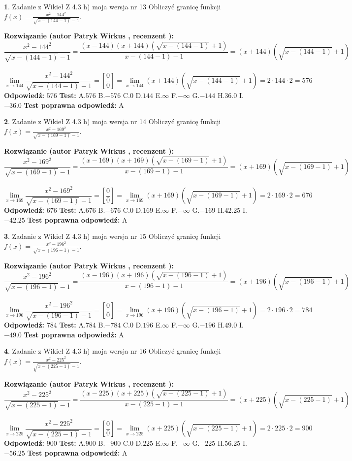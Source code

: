 \documentclass[12pt, a4paper]{article}
\theoremstyle{definition} %
\newtheorem{zad}{}
\newcommand{\zadStart}[1]{\begin{zad}#1\newline}
\newcommand{\zadStop}{\end{zad}}
\newcommand{\rozwStart}[2]{\noindent \textbf{Rozwiązanie (autor #1 , recenzent #2): }\newline}
\newcommand{\rozwStop}{\newline}
\newcommand{\odpStart}{\noindent \textbf{Odpowiedź:}\newline}
\newcommand{\odpStop}{\newline}
\newcommand{\testStart}{\noindent \textbf{Test:}\newline}
\newcommand{\testStop}{\newline}
\newcommand{\kluczStart}{\noindent \textbf{Test poprawna odpowiedź:}\newline}
\newcommand{\kluczStop}{\newline}
\begin{document}
\zadStart{Zadanie z Wikieł Z 4.3 h) moja wersja nr 13}
Obliczyć granicę funkcji $f(x)=\frac{x^{2} - 144^{2}}{\sqrt{x-(144-1)}-1}$.
\zadStop
\rozwStart{Patryk Wirkus}{}
$$\frac{x^{2} - 144^{2}}{\sqrt{x-(144-1)}-1}=\frac{(x-144)(x+144)(\sqrt{x-(144-1)}+1)}{x-(144-1)-1}=(x+144)(\sqrt{x-(144-1)}+1)$$
\\
$$\lim\limits_{x\to 144}\frac{x^{2} - 144^{2}}{\sqrt{x-(144-1)}-1}=[\frac{0}{0}]=
\lim\limits_{x\to 144}(x+144)(\sqrt{x-(144-1)}+1) = 2\cdot144 \cdot 2 = 576$$
\rozwStop
\odpStart
$576$
\odpStop
\testStart
A.$576$
B.$-576$
C.$0$
D.$144$
E.$\infty$
F.$-\infty$
G.$-144$
H.$36.0$
I.$-36.0$
\testStop
\kluczStart
A
\kluczStop



\zadStart{Zadanie z Wikieł Z 4.3 h) moja wersja nr 14}
Obliczyć granicę funkcji $f(x)=\frac{x^{2} - 169^{2}}{\sqrt{x-(169-1)}-1}$.
\zadStop
\rozwStart{Patryk Wirkus}{}
$$\frac{x^{2} - 169^{2}}{\sqrt{x-(169-1)}-1}=\frac{(x-169)(x+169)(\sqrt{x-(169-1)}+1)}{x-(169-1)-1}=(x+169)(\sqrt{x-(169-1)}+1)$$
\\
$$\lim\limits_{x\to 169}\frac{x^{2} - 169^{2}}{\sqrt{x-(169-1)}-1}=[\frac{0}{0}]=
\lim\limits_{x\to 169}(x+169)(\sqrt{x-(169-1)}+1) = 2\cdot169 \cdot 2 = 676$$
\rozwStop
\odpStart
$676$
\odpStop
\testStart
A.$676$
B.$-676$
C.$0$
D.$169$
E.$\infty$
F.$-\infty$
G.$-169$
H.$42.25$
I.$-42.25$
\testStop
\kluczStart
A
\kluczStop



\zadStart{Zadanie z Wikieł Z 4.3 h) moja wersja nr 15}
Obliczyć granicę funkcji $f(x)=\frac{x^{2} - 196^{2}}{\sqrt{x-(196-1)}-1}$.
\zadStop
\rozwStart{Patryk Wirkus}{}
$$\frac{x^{2} - 196^{2}}{\sqrt{x-(196-1)}-1}=\frac{(x-196)(x+196)(\sqrt{x-(196-1)}+1)}{x-(196-1)-1}=(x+196)(\sqrt{x-(196-1)}+1)$$
\\
$$\lim\limits_{x\to 196}\frac{x^{2} - 196^{2}}{\sqrt{x-(196-1)}-1}=[\frac{0}{0}]=
\lim\limits_{x\to 196}(x+196)(\sqrt{x-(196-1)}+1) = 2\cdot196 \cdot 2 = 784$$
\rozwStop
\odpStart
$784$
\odpStop
\testStart
A.$784$
B.$-784$
C.$0$
D.$196$
E.$\infty$
F.$-\infty$
G.$-196$
H.$49.0$
I.$-49.0$
\testStop
\kluczStart
A
\kluczStop



\zadStart{Zadanie z Wikieł Z 4.3 h) moja wersja nr 16}
Obliczyć granicę funkcji $f(x)=\frac{x^{2} - 225^{2}}{\sqrt{x-(225-1)}-1}$.
\zadStop
\rozwStart{Patryk Wirkus}{}
$$\frac{x^{2} - 225^{2}}{\sqrt{x-(225-1)}-1}=\frac{(x-225)(x+225)(\sqrt{x-(225-1)}+1)}{x-(225-1)-1}=(x+225)(\sqrt{x-(225-1)}+1)$$
\\
$$\lim\limits_{x\to 225}\frac{x^{2} - 225^{2}}{\sqrt{x-(225-1)}-1}=[\frac{0}{0}]=
\lim\limits_{x\to 225}(x+225)(\sqrt{x-(225-1)}+1) = 2\cdot225 \cdot 2 = 900$$
\rozwStop
\odpStart
$900$
\odpStop
\testStart
A.$900$
B.$-900$
C.$0$
D.$225$
E.$\infty$
F.$-\infty$
G.$-225$
H.$56.25$
I.$-56.25$
\testStop
\kluczStart
A
\kluczStop
\end{document}
